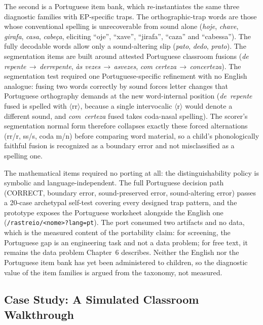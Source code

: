 The second is a Portuguese item bank, which re-instantiates the same three diagnostic families with EP-specific traps. The orthographic-trap words are those whose conventional spelling is unrecoverable from sound alone (\emph{hoje}, \emph{chave}, \emph{girafa}, \emph{casa}, \emph{cabeça}, eliciting ``oje'', ``xave'', ``jirafa'', ``caza'' and ``cabessa''). The fully decodable words allow only a sound-altering slip (\emph{pato}, \emph{dedo}, \emph{prato}). The segmentation items are built around attested Portuguese classroom fusions (\emph{de repente}$\,\to\,$\emph{derrepente}, \emph{às vezes}$\,\to\,$\emph{asvezes}, \emph{com certeza}$\,\to\,$\emph{concerteza}). The segmentation test required one Portuguese-specific refinement with no English analogue: fusing two words correctly by sound forces letter changes that Portuguese orthography demands at the new word-internal position (\emph{de~repente} fused is spelled with $\langle$rr$\rangle$, because a single intervocalic $\langle$r$\rangle$ would denote a different sound, and \emph{com~certeza} fused takes coda-nasal spelling). The scorer's segmentation normal form therefore collapses exactly these forced alternations (rr/r, ss/s, coda m/n) before comparing word material, so a child's phonologically faithful fusion is recognized as a boundary error and not misclassified as a spelling one.

The mathematical items required no porting at all: the distinguishability policy is symbolic and language-independent. The full Portuguese decision path (CORRECT, boundary error, sound-preserved error, sound-altering error) passes a 20-case archetypal self-test covering every designed trap pattern, and the prototype exposes the Portuguese worksheet alongside the English one (\texttt{/rastreio/<nome>?lang=pt}). The port consumed two artifacts and no data, which is the measured content of the portability claim: for screening, the Portuguese gap is an engineering task and not a data problem; for free text, it remains the data problem Chapter~6 describes. Neither the English nor the Portuguese item bank has yet been administered to children, so the diagnostic value of the item families is argued from the taxonomy, not measured.

\subsection{Case Study: A Simulated Classroom Walkthrough}
\label{sec:impl_prototype_casestudy}

